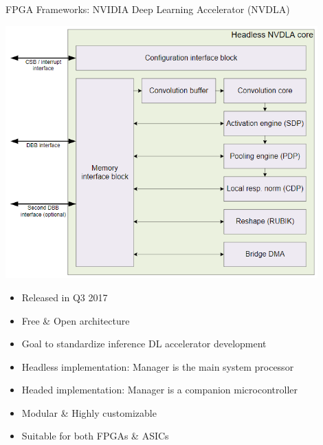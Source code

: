 \begin{frame}{FPGA Frameworks: NVIDIA Deep Learning Accelerator (NVDLA)}
	\begin{minipage}{0.5\textwidth}
		\centering
		\includegraphics[width=0.9\textwidth]{../Images/Hardware/nvdla-hardware-architecture.png}\\
	\end{minipage}%
	\begin{minipage}{0.5\textwidth}
		\begin{itemize}
			\item Released in Q3 2017
			\item Free \& Open architecture
			\item Goal to standardize inference DL accelerator development
			\item Headless implementation: Manager is the main system processor
			\item Headed implementation: Manager is a companion microcontroller
			\item Modular \& Highly customizable
			\item Suitable for both FPGAs \& ASICs
		\end{itemize}
	\end{minipage}
\end{frame}

